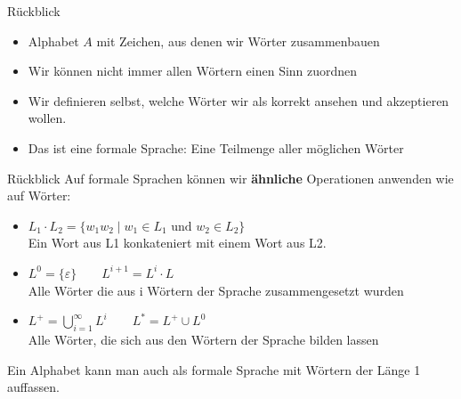 \framePrevEpisode

\begin{frame}{Rückblick}
	\begin{itemize}
		\item Alphabet $A$ mit Zeichen, aus denen wir Wörter zusammenbauen
		\item Wir können nicht immer allen Wörtern einen Sinn zuordnen 
		\item Wir definieren selbst, welche Wörter wir als korrekt ansehen und akzeptieren wollen.
		\item Das ist eine formale Sprache: Eine Teilmenge aller möglichen Wörter
	\end{itemize}
\end{frame}

\begin{frame}{Rückblick}
	Auf formale Sprachen können wir \textbf{ähnliche} Operationen anwenden wie auf Wörter:
	\begin{itemize}
		\item $L_1 \cdot L_2 = \{w_1 w_2 \mid w_1 \in L_1 \text{ und } w_2 \in L_2 \}$\\
		Ein Wort aus L1 konkateniert mit einem Wort aus L2.
		\pause
		\item $L^0 = \{\varepsilon \} \qquad L^{i+1} = L^i \cdot L$\\
		Alle Wörter die aus i Wörtern der Sprache zusammengesetzt wurden
		\pause
		\item $L^+ = \bigcup \limits_{i=1}^\infty L^i \qquad L^* = L^+ \cup L^0$\\
		Alle Wörter, die sich aus den Wörtern der Sprache bilden lassen
	\end{itemize}
	Ein Alphabet kann man auch als formale Sprache mit Wörtern der Länge 1 auffassen.
\end{frame}

\begin{frame}
\end{frame}





